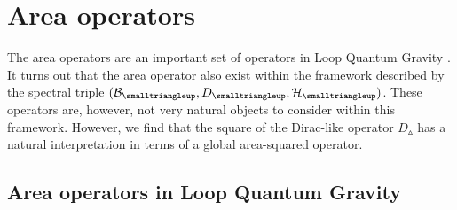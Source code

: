 \documentclass[12pt]{article}
\newcommand{\ba}{\begin{eqnarray}}
\newcommand{\ea}{\end{eqnarray}}
\def\ca{{\cal A}}
\def\cb{{\cal B}}
\def\ch{{\cal H}}
\begin{document}






















































\section{Area operators}
\label{sectionarea}

The area operators are an important set of operators in Loop Quantum Gravity \cite{Ashtekar:1996eg}. It turns out that the area operator also exist within the framework described by the spectral triple $(\cb_{\smalltriangleup},D_{\smalltriangleup},\ch_\smalltriangleup)$. These operators are, however, not very natural objects to consider within this framework. However, we find that the square of the Dirac-like operator $D_{\smalltriangleup}$ has a natural interpretation in terms of a global area-squared operator. 


\subsection{Area operators in Loop Quantum Gravity}
\end{document}
